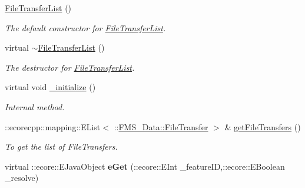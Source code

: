 \begin{DoxyCompactItemize}
\item 
\hypertarget{classFMS__Data_1_1FileTransferList_adf85524b12287b91901405b2ff80adeb}{
\hyperlink{classFMS__Data_1_1FileTransferList_adf85524b12287b91901405b2ff80adeb}{FileTransferList} ()}
\label{classFMS__Data_1_1FileTransferList_adf85524b12287b91901405b2ff80adeb}

\begin{DoxyCompactList}\small\item\em The default constructor for \hyperlink{classFMS__Data_1_1FileTransferList}{FileTransferList}. \item\end{DoxyCompactList}\item 
\hypertarget{classFMS__Data_1_1FileTransferList_a61d04a5dff1a5162649a85082108046a}{
virtual \hyperlink{classFMS__Data_1_1FileTransferList_a61d04a5dff1a5162649a85082108046a}{$\sim$FileTransferList} ()}
\label{classFMS__Data_1_1FileTransferList_a61d04a5dff1a5162649a85082108046a}

\begin{DoxyCompactList}\small\item\em The destructor for \hyperlink{classFMS__Data_1_1FileTransferList}{FileTransferList}. \item\end{DoxyCompactList}\item 
\hypertarget{classFMS__Data_1_1FileTransferList_a51591fe0e7132b9394073cdddbf29f5f}{
virtual void \hyperlink{classFMS__Data_1_1FileTransferList_a51591fe0e7132b9394073cdddbf29f5f}{\_\-initialize} ()}
\label{classFMS__Data_1_1FileTransferList_a51591fe0e7132b9394073cdddbf29f5f}

\begin{DoxyCompactList}\small\item\em Internal method. \item\end{DoxyCompactList}\item 
::ecorecpp::mapping::EList$<$ ::\hyperlink{classFMS__Data_1_1FileTransfer}{FMS\_\-Data::FileTransfer} $>$ \& \hyperlink{classFMS__Data_1_1FileTransferList_aeda303534fb00cae2bcaef502490a1fd}{getFileTransfers} ()
\begin{DoxyCompactList}\small\item\em To get the list of FileTransfers. \item\end{DoxyCompactList}\item 
\hypertarget{classFMS__Data_1_1FileTransferList_a6942dbbc793712e286e05abc4c4c2753}{
virtual ::ecore::EJavaObject {\bfseries eGet} (::ecore::EInt \_\-featureID,::ecore::EBoolean \_\-resolve)}
\label{classFMS__Data_1_1FileTransferList_a6942dbbc793712e286e05abc4c4c2753}


\end{DoxyCompactItemize}
